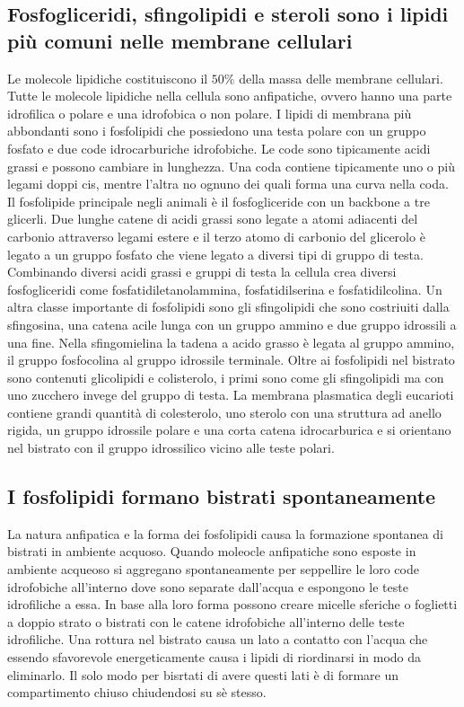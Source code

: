 \subsection{Fosfogliceridi, sfingolipidi e steroli sono i lipidi pi\`u comuni nelle membrane cellulari}
Le molecole lipidiche costituiscono il $50\%$ della massa delle membrane cellulari. Tutte le molecole lipidiche nella cellula sono anfipatiche, ovvero
hanno una parte idrofilica o polare e una idrofobica o non polare. I lipidi di membrana pi\`u abbondanti sono i fosfolipidi che possiedono una testa
polare con un gruppo fosfato e due code idrocarburiche idrofobiche. Le code sono tipicamente acidi grassi e possono cambiare in lunghezza. Una coda
contiene tipicamente uno o pi\`u legami doppi cis, mentre l'altra no ognuno dei quali forma una curva nella coda. Il fosfolipide principale negli animali
\`e il fosfogliceride con un backbone a tre glicerli. Due lunghe catene di acidi grassi sono legate a atomi adiacenti del carbonio attraverso legami
estere e il terzo atomo di carbonio del glicerolo \`e legato a un gruppo fosfato che viene legato a diversi tipi di gruppo di testa. Combinando diversi
acidi grassi e gruppi di testa la cellula crea diversi fosfogliceridi come fosfatidiletanolammina, fosfatidilserina e fosfatidilcolina. Un altra classe
importante di fosfolipidi sono gli sfingolipidi che sono costriuiti dalla sfingosina, una catena acile lunga con un gruppo ammino  e due gruppo idrossili
a una fine. Nella sfingomielina la tadena a acido grasso \`e legata al gruppo ammino, il gruppo fosfocolina al gruppo idrossile terminale. Oltre ai 
fosfolipidi nel bistrato sono contenuti glicolipidi e colisterolo, i primi sono come gli sfingolipidi ma con uno zucchero invege del gruppo di testa. 
La membrana plasmatica degli eucarioti contiene grandi quantit\`a di colesterolo, uno sterolo con una struttura ad anello rigida, un gruppo idrossile 
polare e una corta catena idrocarburica e si orientano nel bistrato con il gruppo idrossilico vicino alle teste polari. 
\subsection{I fosfolipidi formano bistrati spontaneamente}
La natura anfipatica e la forma dei fosfolipidi causa la formazione spontanea di bistrati in ambiente acquoso. Quando moleocle anfipatiche sono esposte in
ambiente acqueoso si aggregano spontaneamente per seppellire le loro code idrofobiche all'interno dove sono separate dall'acqua e espongono le teste
idrofiliche a essa. In base alla loro forma possono creare micelle sferiche o foglietti a doppio strato o bistrati con le catene idrofobiche all'interno
delle teste idrofiliche. Una rottura nel bistrato causa un lato a contatto con l'acqua che essendo sfavorevole energeticamente causa i lipidi di 
riordinarsi in modo da eliminarlo. Il solo modo per bisrtati di avere questi lati \`e di formare un compartimento chiuso chiudendosi su s\`e stesso. 
